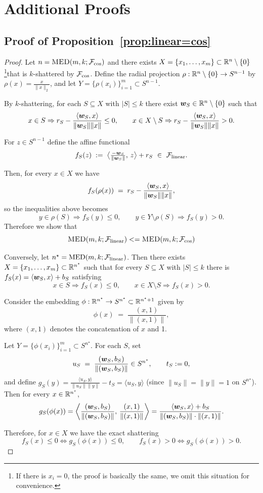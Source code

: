 \section{Additional Proofs}

\subsection{Proof of Proposition~\ref{prop:linear=cos}}\label{app:proof:prop:linear=cos}


\begin{proof}
Let $n=\textsc{MED}(m, k; \mathcal{F}_{\cos})$ and there exists $X=\{x_1,\dots,x_m\}\subset\mathbb{R}^{n}\setminus\{0\}$ \footnote{If there is $x_i = 0$, the proof is basically the same, we omit this situation for convenience.}that is $k$-shattered by $\mathcal{F}_{\cos}$.
Define the radial projection $\rho:\mathbb{R}^{n}\setminus\{0\}\to S^{n-1}$ by $\rho(x)=\frac{x}{\|x\|_2}$, and let
$Y=\{\rho(x_i)\}_{i=1}^m\subset S^{n-1}$.

By $k$-shattering, for each $S\subseteq X$ with $|S|\le k$ there exist $\bm{w}_S\in\mathbb{R}^{n}\setminus\{0\}$ such that
\[
x\in S \Rightarrow r_S-\frac{\langle \bm{w}_S,x\rangle}{\|\bm{w}_S\|\|x\|} \le 0,
\qquad
x\in X\setminus S \Rightarrow r_S-\frac{\langle \bm{w}_S,x\rangle}{\|\bm{w}_S\|\|x\|} > 0.
\]

For $z\in S^{n-1}$ define the affine functional
\[
f_S(z)\;:=\;\big\langle \tfrac{-\bm{w}_S}{\|\bm{w}_S\|},\, z \big\rangle + r_S
\ \in\ \mathcal{F}_{\rm linear}.
\]

Then, for every $x\in X$ we have
\[
f_S(\rho(x)) \;=\; r_S-\frac{\langle \bm{w}_S,x\rangle}{\|\bm{w}_S\|\|x\|},
\]
so the inequalities above becomes
\[
y\in \rho(S)\Rightarrow f_S(y)\le 0,\qquad y\in Y\setminus \rho(S)\Rightarrow f_S(y)>0.
\]
Therefore we show that
\[
\textsc{MED}(m, k; \mathcal{F}_{\rm linear}) <= \textsc{MED}(m, k; \mathcal{F}_{\cos})
\]

Conversely, let $n^\star=\mathrm{MED}(m,k;\mathcal{F}_{\rm linear})$. Then there exists $X=\{x_1,\dots,x_m\}\subset\mathbb{R}^{n^\star}$ such that for every $S\subseteq X$ with $|S|\le k$ there is $f_S(x)=\langle \bm{w}_S,x\rangle+b_S$ satisfying
\[
x\in S \Rightarrow f_S(x)\le 0,\qquad x\in X\setminus S \Rightarrow f_S(x)>0.
\]

Consider the embedding $\phi:\mathbb{R}^{n^\star}\to S^{n^\star}\subset\mathbb{R}^{n^\star+1}$ given by
\[
\phi(x)\;=\;\frac{(x,1)}{\|(x,1)\|},
\]
where $(x,1)$ denotes the concatenation of $x$ and 1.

Let $Y=\{\phi(x_i)\}_{i=1}^m\subset S^{n^\star}$. For each $S$, set
\[
u_S\;=\;\frac{(\bm{w}_S,b_S)}{\|(\bm{w}_S,b_S)\|}\in S^{n^\star},\qquad t_S:=0,
\]
and define $g_S(y)=\tfrac{\langle u_S,y\rangle}{\|u_S\|\|y\|}-t_S=\langle u_S,y\rangle$ (since $\|u_S\|=\|y\|=1$ on $S^{n^\star}$).
Then for every $x\in\mathbb{R}^{n^\star}$,
\[
g_S(\phi(x))
=\left\langle \frac{(\bm{w}_S,b_S)}{\|(\bm{w}_S,b_S)\|},\,\frac{(x,1)}{\|(x,1)\|}\right\rangle
=\frac{\langle \bm{w}_S,x\rangle+b_S}{\|(\bm{w}_S,b_S)\|\cdot\|(x,1)\|}.
\]

Therefore, for $x\in X$ we have the exact shattering
\[
f_S(x)\le 0 \iff g_S(\phi(x))\le 0,\qquad
f_S(x)>0 \iff g_S(\phi(x))>0.
\]
\end{proof}


